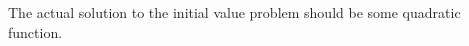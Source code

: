 \documentclass[12pt]{mypackage}
\begin{document}
The actual solution to the initial value problem should be some quadratic function.
\end{document}
